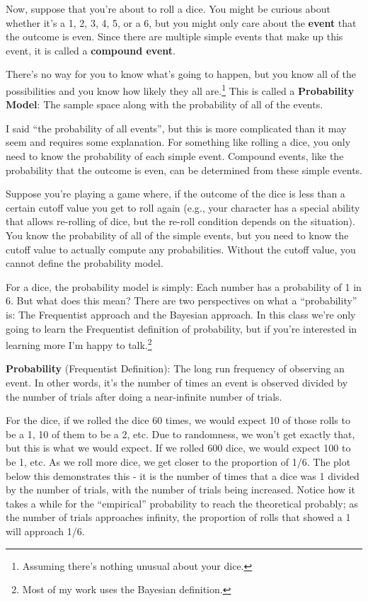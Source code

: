\documentclass[
  letterpaper,
  DIV=11,
  numbers=noendperiod]{scrreprt}
\begin{document}
Now, suppose that you're about to roll a dice. You might be curious
about whether it's a 1, 2, 3, 4, 5, or a 6, but you might only care
about the \textbf{event} that the outcome is even. Since there are
multiple simple events that make up this event, it is called a
\textbf{compound event}.

There's no way for you to know what's going to happen, but you know all
of the possibilities and you know how likely they all are.\footnote{Assuming
  there's nothing unusual about your dice.} This is called a
\textbf{Probability Model}: The sample space along with the probability
of all of the events.

I said ``the probability of all events'', but this is more complicated
than it may seem and requires some explanation. For something like
rolling a dice, you only need to know the probability of each simple
event. Compound events, like the probability that the outcome is even,
can be determined from these simple events.

Suppose you're playing a game where, if the outcome of the dice is less
than a certain cutoff value you get to roll again (e.g., your character
has a special ability that allows re-rolling of dice, but the re-roll
condition depends on the situation). You know the probability of all of
the simple events, but you need to know the cutoff value to actually
compute any probabilities. Without the cutoff value, you cannot define
the probability model.

For a dice, the probability model is simply: Each number has a
probability of 1 in 6. But what does this mean? There are two
perspectives on what a ``probability'' is: The Frequentist approach and
the Bayesian approach. In this class we're only going to learn the
Frequentist definition of probability, but if you're interested in
learning more I'm happy to talk.\footnote{Most of my work uses the
  Bayesian definition.}

\textbf{Probability} (Frequentist Definition): The long run frequency of
observing an event. In other words, it's the number of times an event is
observed divided by the number of trials after doing a near-infinite
number of trials.

For the dice, if we rolled the dice 60 times, we would expect 10 of
those rolls to be a 1, 10 of them to be a 2, etc. Due to randomness, we
won't get exactly that, but this is what we would expect. If we rolled
600 dice, we would expect 100 to be 1, etc. As we roll more dice, we get
closer to the proportion of 1/6. The plot below this demonstrates this -
it is the number of times that a dice was 1 divided by the number of
trials, with the number of trials being increased. Notice how it takes a
while for the ``empirical'' probability to reach the theoretical
probably; as the number of trials approaches infinity, the proportion of
rolls that showed a 1 will approach 1/6.
\end{document}
